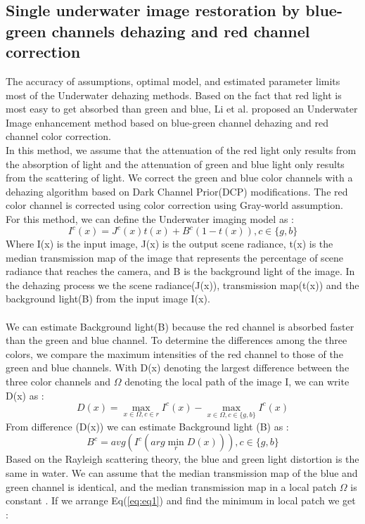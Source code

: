 \documentclass[a4paper,11pt,oneside]{article}
\begin{document}
\subsection{Single underwater image restoration by blue-green channels dehazing and red channel correction \cite{26}}
The accuracy of assumptions, optimal model, and estimated parameter limits most of the Underwater dehazing methods. Based on the fact that red light is most easy to get absorbed than green and blue,  Li et al. \cite{26} proposed an Underwater Image enhancement method based on blue-green channel dehazing and red channel color correction.\\
In this method, we assume that the attenuation of the red light only results from the absorption of light and the attenuation of green and blue light only results from the scattering of light. We correct the green and blue color channels with a dehazing algorithm based on Dark Channel Prior(DCP) modifications. The red color channel is corrected using color correction using Gray-world assumption. \cite{26}\\
For this method, we can define the Underwater imaging model as \cite{26}:
\begin{equation}
\label{eq:eq1}
I^{c}(x) = J^{c}(x) t(x) + B^{c} (1 - t(x)), c \in \{g, b\}
\end{equation}
Where I(x) is the input image, J(x) is the output scene radiance, t(x) is the median transmission map of the image that represents the percentage of scene radiance that reaches the camera, and B is the background light of the image. In the dehazing process we the scene radiance(J(x)), transmission map(t(x)) and the background light(B) from the input image I(x). \cite{26}\\
\\
We can estimate Background light(B) because the red channel is absorbed faster than the green and blue channel. To determine the differences among the three colors, we compare the maximum intensities of the red channel to those of the green and blue channels. With D(x) denoting the largest difference between the three color channels and $\Omega$ denoting the local path of the image I, we can write D(x) as \cite{26}:
$$D(x) = \max_{x \in \Omega, c \in r}I^{c}(x) - \max_{x \in \Omega, c \in \{g,b\}}I^{c}(x)$$
From difference (D(x)) we can estimate Background light (B) as \cite{26}:
$$B^c = avg(I^c(arg \min_{r}D(x))), c \in \{g,b\}$$
Based on the Rayleigh scattering theory, the blue and green light distortion is the same in water. We can assume that the median transmission map of the blue and green channel is identical, and the median transmission map in a local patch $\Omega$ is constant \cite{26}. If we arrange Eq(\eqref{eq:eq1}) and find the minimum in local patch we get \cite{26}:
\end{document}
